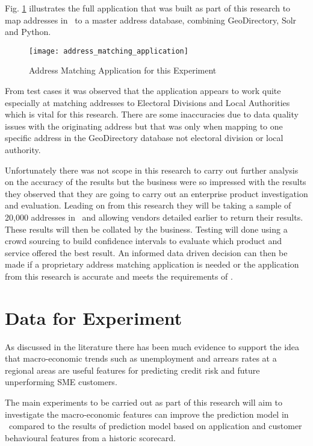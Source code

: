 Fig. \ref{fig:address_matching_application} illustrates the full application that was built as part of this research to map addresses in \subjectname\ to a master address database, combining GeoDirectory, Solr and Python.

\begin{figure}[H]
	\texttt{[image: address\_matching\_application]}
	\caption{Address Matching Application for this Experiment}
	\label{fig:address_matching_application}
\end{figure}

From test cases it was observed that the application appears to work quite especially at matching addresses to Electoral Divisions and Local Authorities which is vital for this research. There are some inaccuracies due to data quality issues with the originating address but that was only when mapping to one specific address in the GeoDirectory database not electoral division or local authority.

Unfortunately there was not scope in this research to carry out further analysis on the accuracy of the results but the business were so impressed with the results they observed that they are going to carry out an enterprise product investigation and evaluation. Leading on from this research they will be taking a sample of 20,000 addresses in \subjectname\ and allowing vendors detailed earlier to return their results. These results will then be collated by the business. Testing will done using a crowd sourcing to build confidence intervals to evaluate which product and service offered the best result. An informed data driven decision can then be made if a proprietary address matching application is needed or the application from this research is accurate and meets the requirements of \subjectname.  


\section{Data for Experiment}
As discussed in the literature there has been much evidence to support the idea that macro-economic trends such as unemployment and arrears rates at a regional areas are useful features for predicting credit risk and future unperforming SME customers.

The main experiments to be carried out as part of this research will aim to investigate the macro-economic features can improve the prediction model in \subjectname\ compared to the results of prediction model based on application and customer behavioural features from a historic scorecard. 

